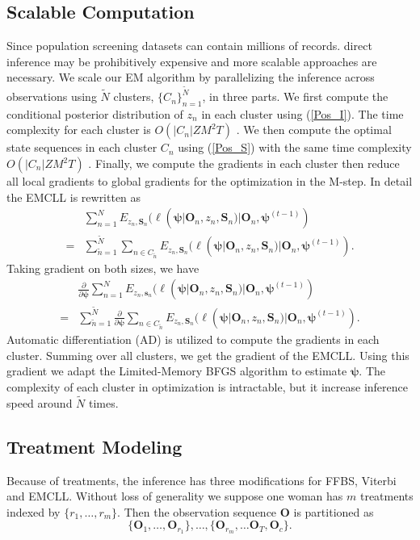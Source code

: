 \documentclass{article}
\begin{document}
\subsection{Scalable Computation} \label{sec:scale}
Since population screening datasets can contain millions of records. direct inference may be prohibitively expensive and more scalable approaches are necessary. We scale our EM algorithm by parallelizing the inference across observations using $\tilde{N}$ clusters, $\{C_n\}_{n=1}^{\tilde{N}}$, in three parts. We first compute the conditional posterior distribution of $z_n$ in each cluster using (\ref{Pos_I}). The time complexity for each cluster is $O(|C_n|ZM^2T)$ \citep{KHREICH_2010}. We then compute the optimal state sequences in each cluster $C_n$ using (\ref{Pos_S}) with the same time complexity $O(|C_n|ZM^2T)$ \citep{Arturs_2016}. Finally, we compute the gradients in each cluster then reduce all local gradients to global gradients for the optimization in the M-step. In detail the EMCLL is rewritten as
\begin{eqnarray*}
	& \sum_{n=1}^{N}E_{z_n,\bm S_n}(\ell(\bm \psi| \bm O_n, z_n, \bm S_n)| \bm O_n, \bm \psi^{(t-1)}) \\ 
	= & \sum_{\tilde{n}=1}^{\tilde{N}}\sum_{n\in C_{\tilde{n}}}E_{z_n,\bm S_n}(\ell(\bm \psi| \bm O_n, z_n, \bm S_n)| \bm O_n, \bm \psi^{(t-1)}).
\end{eqnarray*} 
Taking gradient on both sizes, we have
\begin{eqnarray*}
	& \frac{\partial}{\partial \bm{\psi}}\sum_{n=1}^{N}E_{z_n,\bm s_n}(\ell(\bm \psi| \bm O_n, z_n, \bm S_n)| \bm O_n, \bm \psi^{(t-1)}) \\
	= & \sum_{\tilde{n}=1}^{\tilde{N}} \frac{\partial}{\partial \bm{\psi}}\sum_{n\in C_{\tilde{n}}}E_{z_n,\bm S_n}(\ell(\bm \psi| \bm O_n, z_n, \bm S_n)| \bm O_n, \bm \psi^{(t-1)}).
\end{eqnarray*}
Automatic differentiation (AD) \cite{Baydin_2018} is utilized to compute the gradients in each cluster. Summing over all clusters, we get the gradient of the EMCLL. Using this gradient we adapt the Limited-Memory BFGS \cite{Liu_1989} algorithm to estimate $\bm \psi$. The complexity of each cluster in optimization is intractable, but it increase inference speed around $\tilde{N}$ times.

\subsection{Treatment Modeling}\label{sec:treatment}
Because of treatments, the inference has three modifications for FFBS, Viterbi and EMCLL. Without loss of generality we suppose one woman has $m$ treatments indexed by $\{r_1, \ldots, r_m\}$. Then the observation sequence $\bm O$ is partitioned as 
$$\{\bm O_1, \ldots, \bm O_{r_1}\}, \ldots, \{\bm O_{r_m}, \ldots \bm O_T, \bm O_{c} \}.$$
\end{document}
